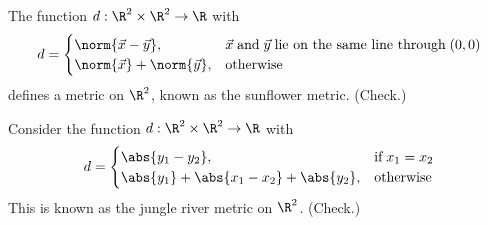 \documentclass[draft]{penrose}
\begin{document}
\begin{negg}
  The function $d:\R^2 \times \R^2 \to \R$ with
  \begin{equation*}
  d = \begin{cases}
  \norm{\vec{x}-\vec{y}}, & \vec{x}\;\text{and}\;\vec{y}\;\text{lie on the same line through}\;(0,0)\\
  \norm{\vec{x}}+\norm{\vec{y}}, & \text{otherwise}
  \end{cases}
  \end{equation*}
  defines a metric on $\R^2$, known as the sunflower metric. (Check.)
\end{negg}

\begin{negg}
  Consider the function $d:\R^2 \times \R^2 \to \R$ with
  \begin{equation*}
  d = \begin{cases}
  \abs{y_1 - y_2}, & \text{if}\;x_1 = x_2\\
  \abs{y_1} + \abs{x_1 - x_2} + \abs{y_2}, & \text{otherwise}
  \end{cases}
  \end{equation*}
  This is known as the jungle river metric on $\R^2$. (Check.)
\end{negg}
\end{document}
